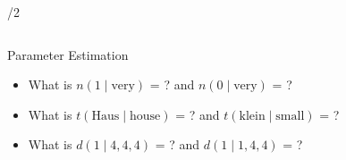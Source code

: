 \begin{frame}
\begin{columns}[t]
\begin{column}{\textwidth/2}
\begin{tikzpicture}
\end{tikzpicture}

\end{column}

\end{columns}\pause

\begin{block}{Parameter Estimation}
\begin{itemize}[<+->]
\item What is $n(1 \mid \textrm{very})$ = ? and $n(0 \mid \textrm{very})$ = ?
\item What is $t(\textrm{Haus} \mid \textrm{house})$ = ? and $t(\textrm{klein} \mid \textrm{small})$ = ?
\item What is $d(1 \mid 4, 4, 4)$ = ? and $d(1 \mid 1, 4, 4)$ = ?
\end{itemize}
\end{block}
\end{frame}

